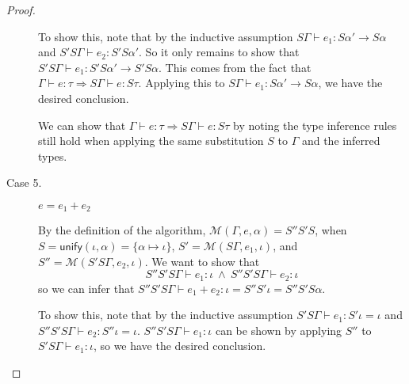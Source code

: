 \documentclass{article}
\begin{document}
\begin{proof}
\begin{description}
To show this, note that by the inductive assumption $S\Gamma \vdash e_1 : S\alpha' \rightarrow S\alpha$ and $S'S\Gamma \vdash e_2 : S'S\alpha'$. So it only remains to show that $S'S\Gamma \vdash e_1 : S'S\alpha' \rightarrow S'S\alpha$. This comes from the fact that $\Gamma \vdash e : \tau \Rightarrow S\Gamma \vdash e : S\tau$. Applying this to $S\Gamma \vdash e_1 : S\alpha' \rightarrow S\alpha$, we have the desired conclusion.

We can show that $\Gamma \vdash e : \tau \Rightarrow S\Gamma \vdash e : S\tau$ by noting the type inference rules still hold when applying the same substitution $S$ to $\Gamma$ and the inferred types.

\item[Case 5.] $e = e_1 + e_2$

By the definition of the algorithm, $\mathcal{M}(\Gamma, e, \alpha) = S''S'S$, when $S = \mathsf{unify}(\iota, \alpha) = \{\alpha\mapsto\iota\}$, $S' = \mathcal{M}(S\Gamma, e_1, \iota)$, and $S'' = \mathcal{M}(S'S\Gamma, e_2, \iota)$. We want to show that
\[S''S'S\Gamma \vdash e_1 : \iota \:\wedge\: S''S'S\Gamma \vdash e_2 : \iota \] so we can infer that $S''S'
S\Gamma \vdash e_1 + e_2 : \iota = S''S'\iota = S''S'S\alpha$.

To show this, note that by the inductive assumption $S'S\Gamma \vdash e_1 : S'\iota = \iota$ and $S''S'S\Gamma \vdash e_2 : S''\iota = \iota$. $S''S'S\Gamma \vdash e_1 : \iota$ can be shown by applying $S''$ to $S'S\Gamma \vdash e_1 : \iota$, so we have the desired conclusion.
\end{description}
\end{proof}
\end{document}
